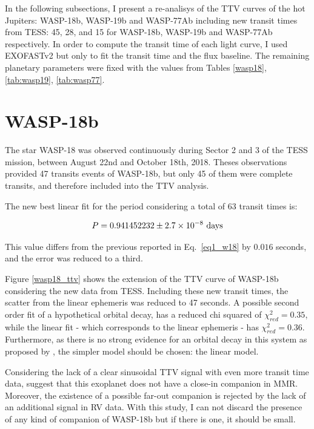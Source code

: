 In the following subsections, I present a re-analisys of the TTV curves of the hot Jupiters: WASP-18b, WASP-19b and WASP-77Ab including new transit times from TESS: 45, 28, and 15 for WASP-18b, WASP-19b and WASP-77Ab respectively. In order to compute the transit time of each light curve, I used EXOFASTv2 but only to fit the transit time and the flux baseline. The remaining planetary parameters were fixed with the values from Tables \ref{wasp18}, \ref{tab:wasp19}, \ref{tab:wasp77}.

\section{WASP-18b}

The star WASP-18 was observed continuously during Sector 2 and 3 of the TESS mission, between August 22nd and October 18th, 2018. Theses observations provided 47 transits events of WASP-18b, but only 45 of them were complete transits, and therefore included into the TTV analysis. 

The new best linear fit for the period considering a total of 63 transit times is:

\begin{equation}
P = 0.941452232 \pm 2.7\times10^{-8} ~\rm days
\end{equation}

This value differs from the previous reported in Eq.~\ref{eq1_w18} by $0.016$ seconds, and the error was reduced to a third.

Figure \ref{wasp18_ttv} shows the extension of the TTV curve of WASP-18b considering the new data from TESS. Including these new transit times, the scatter from the linear ephemeris was reduced to 47 seconds. A possible second order fit of a hypothetical orbital decay, has a reduced chi squared of $\chi^{2}_{red}=0.35$, while the linear fit - which corresponds to the linear ephemeris - has $\chi^{2}_{red}=0.36$. Furthermore, as there is no strong evidence for an orbital decay in this system as proposed by \cite{Wilkins2017}, the simpler model should be chosen: the linear model.

Considering the lack of a clear sinusoidal TTV signal with even more transit time data, suggest that this exoplanet does not have a close-in companion in MMR. Moreover, the existence of a possible far-out companion is rejected by the lack of an additional signal in RV data. With this study, I can not discard the presence of any kind of companion of WASP-18b but if there is one, it should be small. 


